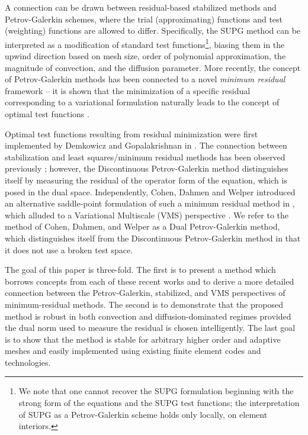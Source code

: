 \documentclass[final,leqno]{siamltex}
\begin{document}
A connection can be drawn between residual-based stabilized methods and Petrov-Galerkin schemes, where the trial (approximating) functions and test (weighting) functions are allowed to differ.  Specifically, the SUPG method can be interpreted as a modification of standard test functions\footnote{We note that one cannot recover the SUPG formulation beginning with the strong form of the equations and the SUPG test functions; the interpretation of SUPG as a Petrov-Galerkin scheme holds only locally, on element interiors.}, biasing them in the upwind direction based on mesh size, order of polynomial approximation, the magnitude of convection, and the diffusion parameter.  More recently, the concept of Petrov-Galerkin methods has been connected to a novel \textit{minimum residual} framework -- it is shown that the minimization of a specific residual corresponding to a variational formulation naturally leads to the concept of optimal test functions \cite{overviewDPG}.  

Optimal test functions resulting from residual minimization were first implemented by Demkowicz and Gopalakrishnan in \cite{DPG2,DPG1}.  The connection between stabilization and least squares/minimum residual methods has been observed previously \cite{GLS}; however, the Discontinuous Petrov-Galerkin method distinguishes itself by measuring the residual of the operator form of the equation, which is posed in the dual space.  Independently, Cohen, Dahmen and Welper introduced an alternative saddle-point formulation of such a minimum residual method in \cite{DahmenVariationalStabilization}, which alluded to a Variational Multiscale (VMS) perspective \cite{VMS1,VMS2,HughesVMS}.  We refer to the method of Cohen, Dahmen, and Welper as a Dual Petrov-Galerkin method, which distinguishes itself from the Discontinuous Petrov-Galerkin method in that it does not use a broken test space.  

The goal of this paper is three-fold.  The first is to present a method which borrows concepts from each of these recent works and to derive a more detailed connection between the Petrov-Galerkin, stabilized, and VMS perspectives of minimum-residual methods.  The second is to demonstrate that the proposed method is robust in both convection and diffusion-dominated regimes provided the dual norm used to measure the residual is chosen intelligently.  The last goal is to show that the method is stable for arbitrary higher order and adaptive meshes and easily implemented using existing finite element codes and technologies. %
\end{document}

